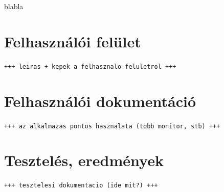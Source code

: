 blabla

\section{Felhasználói felület}\label{sect:gui}

\texttt{+++ leiras + kepek a felhasznalo feluletrol +++}

\section{Felhasználói dokumentáció}\label{sect:docs}

\texttt{+++ az alkalmazas pontos hasznalata (tobb monitor, stb) +++}

\section{Tesztelés, eredmények}\label{sect:teszteles}

\texttt{+++ tesztelesi dokumentacio (ide mit?) +++}
